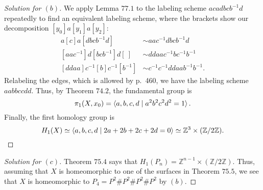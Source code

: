\documentclass[12pt]{article}
\theoremstyle{remark}
\begin{document}
\begin{proof}[Solution for $(b)$]
  We apply Lemma $77.1$ to the labeling scheme $acadbcb^{-1}d$ repeatedly to find an equivalent labeling scheme, where the brackets show our decomposition $[y_0]a[y_1]a[y_2]$:
  \begin{align*}
    [~]a[c]a[dbcb^{-1}d] &\sim aac^{-1}dbcb^{-1}d\\
    [aac^{-1}]d[bcb^{-1}]d[~] &\sim ddaac^{-1}bc^{-1}b^{-1}\\
    [ddaa]c^{-1}[b]c^{-1}[b^{-1}] &\sim c^{-1}c^{-1}ddaab^{-1}b^{-1}.
  \end{align*}
  Relabeling the edges, which is allowed by p.~460, we have the labeling scheme $aabbccdd$. Thus, by Theorem $74.2$, the fundamental group is
  \begin{equation*}
    \pi_1(X,x_0) = \braket{a,b,c,d \mid a^2b^2c^2d^2 = 1}.
  \end{equation*}
  Finally, the first homology group is
  \begin{equation*}
    H_1(X) \simeq \braket{a,b,c,d \mid 2a + 2b + 2c + 2d = 0} \simeq
    \mathbb{Z}^3 \times (\mathbb{Z}/2\mathbb{Z}).\qedhere
  \end{equation*}
\end{proof}
\begin{proof}[Solution for $(c)$]
  Theorem $75.4$ says that $H_1(P_n) = \mathbb{Z}^{n-1} \times (\mathbb{Z}/2\mathbb{Z})$. Thus, assuming that $X$ is homeomorphic to one of the surfaces in Theorem $75.5$, we see that $X$ is homeomorphic to $P_4 = P^2\#P^2\#P^2\#P^2$ by $(b)$.
\end{proof}
\end{document}
